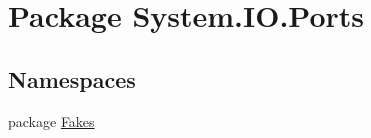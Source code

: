 \hypertarget{namespace_system_1_1_i_o_1_1_ports}{\section{Package System.\-I\-O.\-Ports}
\label{namespace_system_1_1_i_o_1_1_ports}
}
\subsection*{Namespaces}
\begin{DoxyCompactItemize}
\item 
package \hyperlink{namespace_system_1_1_i_o_1_1_ports_1_1_fakes}{Fakes}
\end{DoxyCompactItemize}
